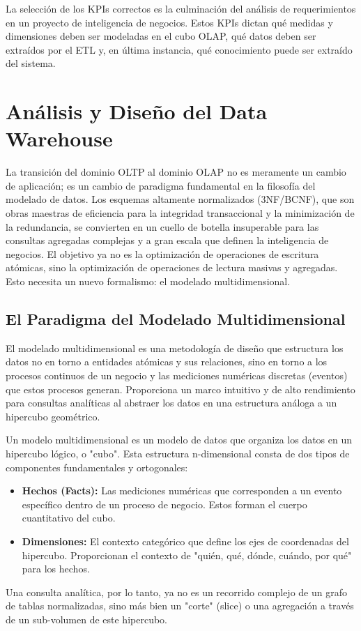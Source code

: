 \documentclass{article}
\newenvironment{definition}[1][Definición]{\begin{trivlist}
\item[\hskip \labelsep {\bfseries #1}]}{\end{trivlist}}
\begin{document}
La selección de los KPIs correctos es la culminación del análisis de requerimientos en un proyecto de inteligencia de negocios. Estos KPIs dictan qué medidas y dimensiones deben ser modeladas en el cubo OLAP, qué datos deben ser extraídos por el ETL y, en última instancia, qué conocimiento puede ser extraído del sistema.

\section{Análisis y Diseño del Data Warehouse}
La transición del dominio OLTP al dominio OLAP no es meramente un cambio de aplicación; es un cambio de paradigma fundamental en la filosofía del modelado de datos. Los esquemas altamente normalizados (3NF/BCNF), que son obras maestras de eficiencia para la integridad transaccional y la minimización de la redundancia, se convierten en un cuello de botella insuperable para las consultas agregadas complejas y a gran escala que definen la inteligencia de negocios. El objetivo ya no es la optimización de operaciones de escritura atómicas, sino la optimización de operaciones de lectura masivas y agregadas. Esto necesita un nuevo formalismo: el modelado multidimensional.

\subsection{El Paradigma del Modelado Multidimensional}
El modelado multidimensional es una metodología de diseño que estructura los datos no en torno a entidades atómicas y sus relaciones, sino en torno a los procesos continuos de un negocio y las mediciones numéricas discretas (eventos) que estos procesos generan. Proporciona un marco intuitivo y de alto rendimiento para consultas analíticas al abstraer los datos en una estructura análoga a un hipercubo geométrico.

\begin{definition}[Modelo Multidimensional]
Un modelo multidimensional es un modelo de datos que organiza los datos en un hipercubo lógico, o "cubo". Esta estructura n-dimensional consta de dos tipos de componentes fundamentales y ortogonales:
\begin{itemize}
    \item \textbf{Hechos (Facts):} Las mediciones numéricas que corresponden a un evento específico dentro de un proceso de negocio. Estos forman el cuerpo cuantitativo del cubo.
    \item \textbf{Dimensiones:} El contexto categórico que define los ejes de coordenadas del hipercubo. Proporcionan el contexto de "quién, qué, dónde, cuándo, por qué" para los hechos.
\end{itemize}
Una consulta analítica, por lo tanto, ya no es un recorrido complejo de un grafo de tablas normalizadas, sino más bien un "corte" (slice) o una agregación a través de un sub-volumen de este hipercubo.
\end{definition}
\end{document}
